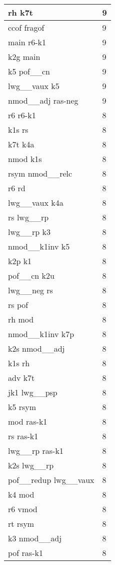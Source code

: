 \documentclass[a4 paper]{article}
\begin{document}
\begin{longtable}{p{}p{}}
rh k7t  & 9 \\ \midrule
ccof fragof  & 9 \\ \midrule
main r6-k1  & 9 \\ \midrule
k2g main  & 9 \\ \midrule
k5 pof\_\_cn  & 9 \\ \midrule
lwg\_\_vaux k5  & 9 \\ \midrule
nmod\_\_adj ras-neg  & 9 \\ \midrule
r6 r6-k1  & 8 \\ \midrule
k1s rs  & 8 \\ \midrule
k7t k4a  & 8 \\ \midrule
nmod k1s  & 8 \\ \midrule
rsym nmod\_\_relc  & 8 \\ \midrule
r6 rd  & 8 \\ \midrule
lwg\_\_vaux k4a  & 8 \\ \midrule
rs lwg\_\_rp  & 8 \\ \midrule
lwg\_\_rp k3  & 8 \\ \midrule
nmod\_\_k1inv k5  & 8 \\ \midrule
k2p k1  & 8 \\ \midrule
pof\_\_cn k2u  & 8 \\ \midrule
lwg\_\_neg rs  & 8 \\ \midrule
rs pof  & 8 \\ \midrule
rh mod  & 8 \\ \midrule
nmod\_\_k1inv k7p  & 8 \\ \midrule
k2s nmod\_\_adj  & 8 \\ \midrule
k1s rh  & 8 \\ \midrule
adv k7t  & 8 \\ \midrule
jk1 lwg\_\_psp  & 8 \\ \midrule
k5 rsym  & 8 \\ \midrule
mod ras-k1  & 8 \\ \midrule
rs ras-k1  & 8 \\ \midrule
lwg\_\_rp ras-k1  & 8 \\ \midrule
k2s lwg\_\_rp  & 8 \\ \midrule
pof\_\_redup lwg\_\_vaux  & 8 \\ \midrule
k4 mod  & 8 \\ \midrule
r6 vmod  & 8 \\ \midrule
rt rsym  & 8 \\ \midrule
k3 nmod\_\_adj  & 8 \\ \midrule
pof ras-k1  & 8 \\ \midrule

\end{longtable}
\end{document}
